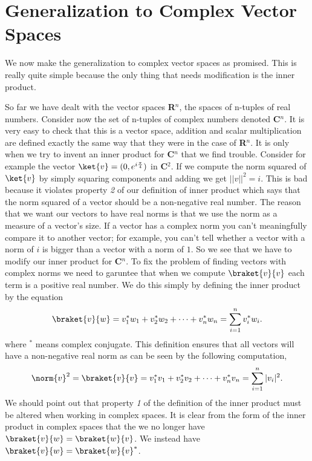 \section{Generalization to Complex Vector Spaces}
We now make the generalization to complex vector spaces as promised.  This is really quite simple because the only thing that needs modification is the inner product.

So far we have dealt with the vector spaces \textbf{R}$^n$, the spaces of n-tuples of real numbers.  Consider now the set of n-tuples of complex numbers denoted \textbf{C}$^n$.  It is very easy to check that this is a vector space, addition and scalar multiplication are defined exactly the same way that they were in the case of \textbf{R}$^n$.  It is only when we try to invent an inner product for \textbf{C}$^n$ that we find trouble.  Consider for example the vector $\ket{v} = (0,e^{i\frac{\pi}{4}})$ in \textbf{C}$^2$.  If we compute the norm squared of $\ket{v}$ by simply squaring components and adding we get $||v||^2 = i$.  This is bad because it violates property \textit{2} of our definition of inner product which says that the norm squared of a vector should be a non-negative real number.  The reason that we want our vectors to have real norms is that we use the norm as a measure of a vector's size.  If a vector has a complex norm you can't meaningfully compare it to another vector; for example, you can't tell whether a vector with a norm of $i$ is bigger than a vector with a norm of $1$.  So we see that we have to modify our inner product for \textbf{C}$^n$.  To fix the problem of finding vectors with complex norms we need to garuntee that when we compute $\braket{v}{v}$ each term is a positive real number.  We do this simply by defining the inner product by the equation
\begin{displaymath} \braket{v}{w} = v_1^*w_1 + v_2^*w_2 + \cdots + v_n^*w_n = \sum_{i=1}^n v_i^*w_i. \end{displaymath}
where $^*$ means complex conjugate.  This definition ensures that all vectors will have a non-negative real norm as can be seen by the following computation,
\begin{displaymath} \norm{v}^2 = \braket{v}{v} = v_1^*v_1 + v_2^*v_2 + \cdots + v_n^*v_n = \sum_{i=1}^n |v_i|^2. \end{displaymath}
We should point out that property \textit{1} of the definition of the inner product must be altered when working in complex spaces.  It is clear from the form of the inner product in complex spaces that the we no longer have $\braket{v}{w} = \braket{w}{v}$.  We instead have $\braket{v}{w} = \braket{w}{v}^*$.

